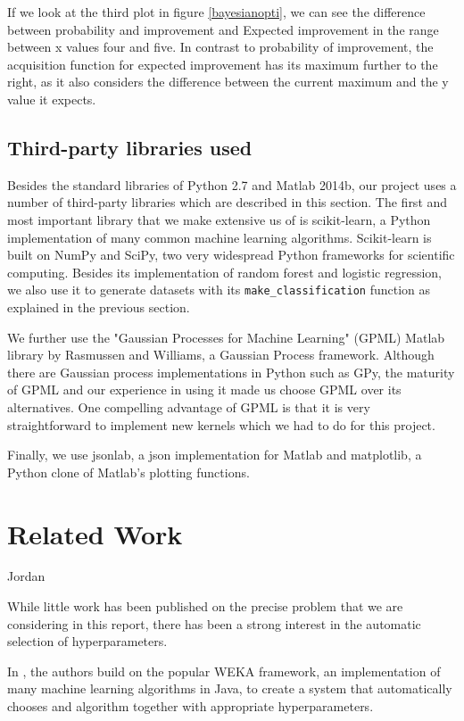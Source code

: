 \documentclass[a4paper,12pt,twoside,openright]{report}
\begin{document}
If we look at the third plot in figure \ref{bayesianopti}, we can see the difference between probability and improvement and Expected improvement in the range between x values four and five. In contrast to probability of improvement, the acquisition function for expected improvement has its maximum further to the right, as it also considers the difference between the current maximum and the y value it expects. 






\section{Third-party libraries used}
Besides the standard libraries of Python 2.7 and Matlab 2014b, our project uses a number of third-party libraries which are described in this section. The first and most important library that we make extensive us of is scikit-learn, a Python implementation of many common machine learning algorithms. Scikit-learn is built on NumPy and SciPy, two very widespread Python frameworks for scientific computing. Besides its implementation of random forest and logistic regression, we also use it to generate datasets with its \texttt{make\_classification} function as explained in the previous section.

We further use the "Gaussian Processes for Machine Learning" (GPML) Matlab library by Rasmussen and Williams, a Gaussian Process framework. Although there are Gaussian process implementations in Python such as GPy, the maturity of GPML and our experience in using it made us choose GPML over its alternatives. One compelling advantage of GPML is that it is very straightforward to implement new kernels which we had to do for this project.

Finally, we use jsonlab, a json implementation for Matlab and matplotlib, a Python clone of Matlab's plotting functions.



\chapter{Related Work}
Jordan \cite{jordan2013}

While little work has been published on the precise problem that we are considering in this report, there has been a strong interest in the automatic selection of hyperparameters.

In \cite{ThoHutHooLey13-AutoWEKA}, the authors build on the popular WEKA framework, an implementation of many machine learning algorithms in Java, to create a system that automatically chooses and algorithm together with appropriate hyperparameters. %
\end{document}
